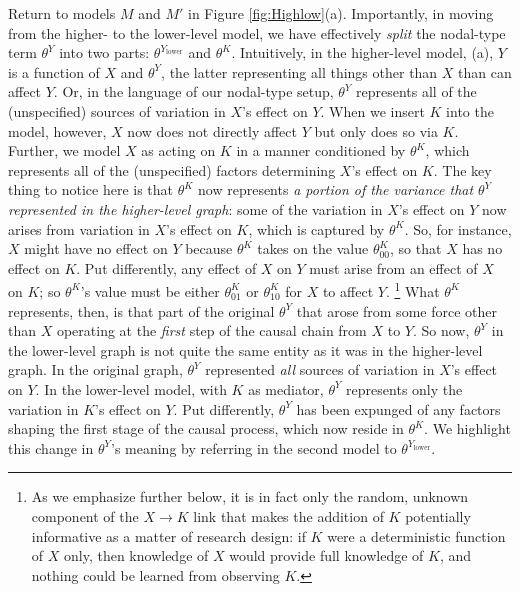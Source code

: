 \documentclass[
  12pt,
]{book}
\begin{document}
Return to models \(M\) and \(M'\) in Figure \ref{fig:Highlow}(a).
Importantly, in moving from the higher- to the lower-level model, we have effectively \emph{split} the nodal-type term \(\theta^Y\) into two parts: \(\theta^{Y_\text{lower}}\) and \(\theta^K\). Intuitively, in the higher-level model, (a), \(Y\) is a function of \(X\) and \(\theta^Y\), the latter representing all things other than \(X\) than can affect \(Y\). Or, in the language of our nodal-type setup, \(\theta^Y\) represents all of the (unspecified) sources of variation in \(X\)'s effect on \(Y\). When we insert \(K\) into the model, however, \(X\) now does not directly affect \(Y\) but only does so via \(K\). Further, we model \(X\) as acting on \(K\) in a manner conditioned by \(\theta^K\), which represents all of the (unspecified) factors determining \(X\)'s effect on \(K\). The key thing to notice here is that \(\theta^K\) now represents \emph{a portion of the variance that \(\theta^Y\) represented in the higher-level graph}: some of the variation in \(X\)'s effect on \(Y\) now arises from variation in \(X\)'s effect on \(K\), which is captured by \(\theta^K\). So, for instance, \(X\) might have no effect on \(Y\) because \(\theta^K\) takes on the value \(\theta^K_{00}\), so that \(X\) has no effect on \(K\). Put differently, any effect of \(X\) on \(Y\) must arise from an effect of \(X\) on \(K\); so \(\theta^K\)'s value must be either \(\theta^K_{01}\) or \(\theta^K_{10}\) for \(X\) to affect \(Y\). \footnote{As we emphasize further below, it is in fact only the random, unknown component of the \(X\rightarrow K\) link that makes the addition of \(K\) potentially informative as a matter of research design: if \(K\) were a deterministic function of \(X\) only, then knowledge of \(X\) would provide full knowledge of \(K\), and nothing could be learned from observing \(K\).} What \(\theta^K\) represents, then, is that part of the original \(\theta^Y\) that arose from some force other than \(X\) operating at the \emph{first} step of the causal chain from \(X\) to \(Y\).
So now, \(\theta^Y\) in the lower-level graph is not quite the same entity as it was in the higher-level graph. In the original graph, \(\theta^Y\) represented \emph{all} sources of variation in \(X\)'s effect on \(Y\). In the lower-level model, with \(K\) as mediator, \(\theta^Y\) represents only the variation in \(K\)'s effect on \(Y\). Put differently, \(\theta^Y\) has been expunged of any factors shaping the first stage of the causal process, which now reside in \(\theta^K\). We highlight this change in \(\theta^Y\)'s meaning by referring in the second model to \(\theta^{Y_\text{lower}}\).
\end{document}
